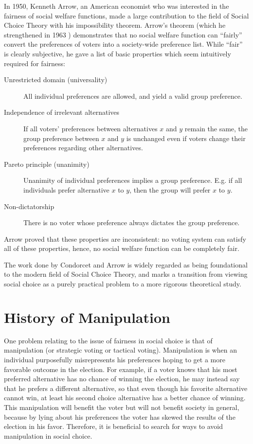 	In 1950, Kenneth Arrow, an American economist who was interested in the fairness of social welfare functions, made a large contribution to the field of Social Choice Theory with his impossibility theorem. Arrow's theorem \cite{arrow1950difficulty} (which he strengthened in 1963 \cite{arrow1963social}) demonstrates that no social welfare function can ``fairly'' convert the preferences of voters into a society-wide preference list. While ``fair'' is clearly subjective, he gave a list of basic properties which seem intuitively required for fairness:
	\begin{description}
		\item[Unrestricted domain (universality)] All individual preferences are allowed, and yield a valid group preference.
		\item[Independence of irrelevant alternatives] If all voters' preferences between alternatives $x$ and $y$ remain the same, the group preference between $x$ and $y$ is unchanged even if voters change their preferences regarding other alternatives.
		\item[Pareto principle (unanimity)] Unanimity of individual preferences implies a group preference. E.g. if all individuals prefer alternative $x$ to $y$, then the group will prefer $x$ to $y$.
		\item[Non-dictatorship] There is no voter whose preference always dictates the group preference.
	\end{description}
	Arrow proved that these properties are inconsistent: no voting system can satisfy all of these properties, hence, no social welfare function can be completely fair.

	The work done by Condorcet and Arrow is widely regarded as being foundational to the modern field of Social Choice Theory, and marks a transition from viewing social choice as a purely practical problem to a more rigorous theoretical study.


\section{History of Manipulation}

	One problem relating to the issue of fairness in social choice is that of manipulation (or strategic voting or tactical voting). Manipulation is when an individual purposefully misrepresents his preferences hoping to get a more favorable outcome in the election. For example, if a voter knows that his most preferred alternative has no chance of winning the election, he may instead say that he prefers a different alternative, so that even though his favorite alternative cannot win, at least his second choice alternative has a better chance of winning. This manipulation will benefit the voter but will not benefit society in general, because by lying about his preferences the voter has skewed the results of the election in his favor. Therefore, it is beneficial to search for ways to avoid manipulation in social choice.

